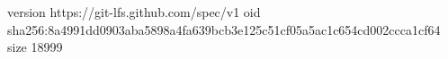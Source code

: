 version https://git-lfs.github.com/spec/v1
oid sha256:8a4991dd0903aba5898a4fa639bcb3e125c51cf05a5ac1c654cd002ccca1cf64
size 18999
